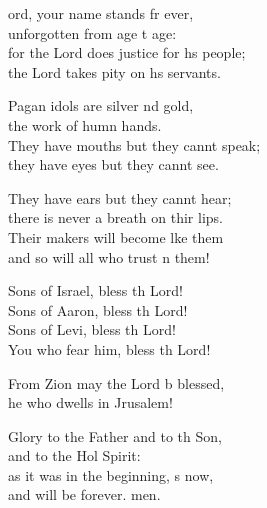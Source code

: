 \settowidth{\versewidth}{for the Lord does justice for his people; *}
\begin{psalmverse}%
  \begin{patverse}
ord, your name stands fr ever,\Med\\
unforgotten from age t age:\\
for the Lord does justice for h\pointup{\i}s people;\Med\\
the Lord takes pity on h\pointup{\i}s servants.

Pagan idols are silver nd gold,\Med\\
the work of humn hands.\\
They have mouths but they cannt speak;\Med\\
they have eyes but they cannt see.

They have ears but they cannt hear;\Med\\
there is never a breath on thir lips.\\
Their makers will become l\pointup{\i}ke them\Med\\
and so will all who trust \pointup{\i}n them!

Sons of Israel, bless th Lord!\Med\\
Sons of Aaron, bless th Lord!\\
Sons of Levi, bless th Lord!\Med\\
You who fear him, bless th Lord!

From Zion may the Lord b blessed,\Med\\
he who dwells in Jrusalem!

Glory to the Father and to th Son,\Med\\
and to the Hol Spirit:\\
as it was in the beginning, \pointup{\i}s now,\Med\\
and will be forever. men.
  \end{patverse}
\end{psalmverse}
